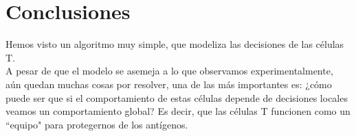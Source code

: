 \documentclass{article}
\begin{document}
	\section{Conclusiones}
	Hemos visto un algoritmo muy simple, que modeliza las decisiones de las células T.
	\\
	A pesar de que el modelo se asemeja a lo que observamos experimentalmente, aún quedan muchas cosas por resolver, una de las más importantes es: ¿cómo puede ser que si el comportamiento de estas células depende de decisiones locales veamos un comportamiento global? Es decir, que las células T funcionen como un ``equipo" para protegernos de los antígenos. 
	
	
\end{document}
